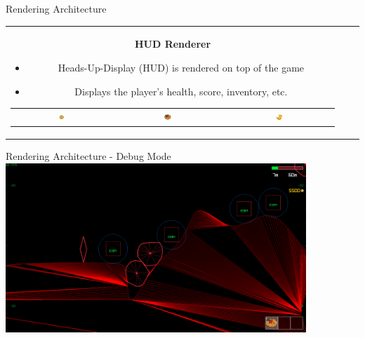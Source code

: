 \begin{frame}{Rendering Architecture}
\begin{tabular}{ccc}
        \parbox{0.3\textwidth}{
            \centering \textbf{HUD Renderer}
            \vspace{0.2cm}
            \begin{itemize}
                \item Heads-Up-Display (HUD) is rendered on top of the game
                \item Displays the player's health, score, inventory, etc.
            \end{itemize}
            \vspace{0.5cm}
            \centering
            \begin{tabular}{ccc}
                \includegraphics[width=0.07\textwidth]{../../assets/texture/coin.png} &
                \includegraphics[width=0.07\textwidth]{../../assets/texture/kaiserschmarrn.png} &
                \includegraphics[width=0.07\textwidth]{../../assets/texture/duck.png}
            \end{tabular}
        }
    \end{tabular}
\end{frame}




\begin{frame}{Rendering Architecture - Debug Mode}
    \centering
    \includegraphics[width=0.85\textwidth]{../figures/Debug-Mode.png}
\end{frame}